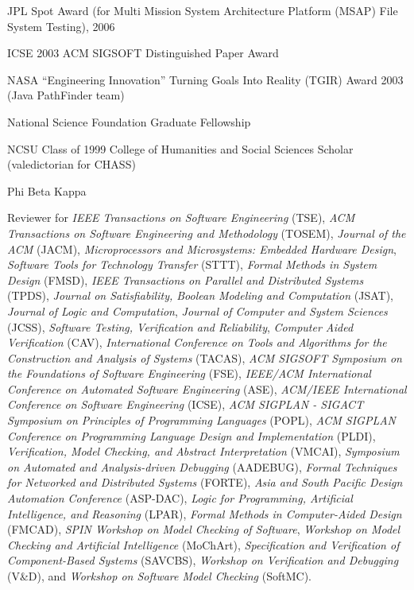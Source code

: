 \documentclass[ComputerScience]{vita}
\begin{document}
\begin{vita}
\begin{Honors}
  \item JPL Spot Award (for Multi Mission System Architecture Platform
  (MSAP) File System Testing), 2006 \item ICSE 2003 ACM SIGSOFT
  Distinguished Paper Award \item NASA ``Engineering Innovation''
  Turning Goals Into Reality (TGIR) Award 2003 (Java PathFinder team)
  \item National Science Foundation Graduate Fellowship \item NCSU
  Class of 1999 College of Humanities and Social Sciences Scholar
  (valedictorian for CHASS) \item Phi Beta Kappa
\end{Honors}

\begin{Professional Activities}
  \item Reviewer for \emph{IEEE Transactions on Software Engineering} (TSE), \emph{ACM
   Transactions
   on  Software  Engineering  and  Methodology} (TOSEM), \emph{Journal of the ACM} (JACM), \emph{Microprocessors and Microsystems: Embedded Hardware Design},
  \emph{Software Tools for Technology Transfer} (STTT), \emph{Formal Methods in System Design} (FMSD), \emph{IEEE Transactions on Parallel and Distributed Systems} (TPDS), \emph{Journal on Satisfiability, Boolean Modeling and Computation} (JSAT), \emph{Journal of Logic and Computation}, \emph{Journal of Computer and System Sciences} (JCSS), \emph{Software Testing, Verification and Reliability}, \emph{Computer Aided
  Verification} (CAV), \emph{International Conference on Tools and Algorithms for the Construction and Analysis of Systems} (TACAS), \emph{ACM SIGSOFT Symposium on the Foundations of Software Engineering} (FSE), \emph{IEEE/ACM International Conference on Automated Software Engineering} (ASE), \emph{ACM/IEEE International Conference on Software Engineering} (ICSE), \emph{ACM SIGPLAN - SIGACT Symposium on Principles of Programming Languages} (POPL), \emph{ACM SIGPLAN Conference on Programming Language Design and Implementation} (PLDI), \emph{Verification, Model Checking, and Abstract Interpretation} (VMCAI), \emph{Symposium on Automated and Analysis-driven Debugging} (AADEBUG), \emph{Formal Techniques for Networked and Distributed Systems} (FORTE), \emph{Asia and South Pacific Design Automation Conference} (ASP-DAC), \emph{Logic for Programming, Artificial Intelligence, and Reasoning} (LPAR), \emph{Formal Methods in Computer-Aided Design} (FMCAD), \emph{SPIN Workshop on Model Checking of Software}, \emph{Workshop on Model Checking and Artificial Intelligence} (MoChArt), \emph{Specification and Verification of Component-Based Systems} (SAVCBS), \emph{Workshop on Verification and Debugging} (V\&D), and \emph{Workshop on Software Model Checking} (SoftMC).

\end{Professional Activities}
\end{vita}
\end{document}
